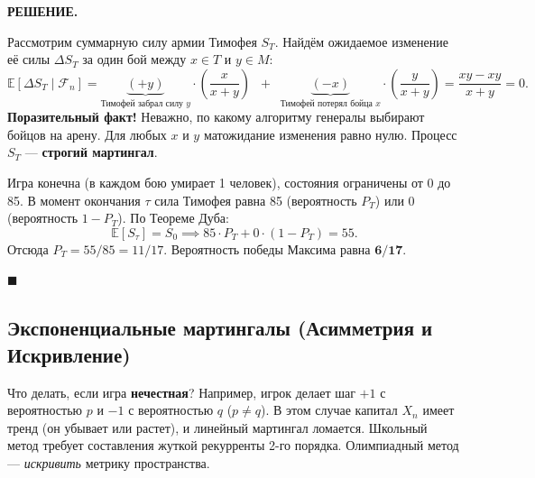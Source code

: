 \documentclass[12pt,a4paper]{article}
\newcommand{\nicefrac}[2]{#1/#2}
\newcommand{\E}{\mathbb{E}}
\newcommand{\F}{\mathcal{F}}
\newenvironment{solution}{
    \begin{tcolorbox}[
        enhanced, breakable, blanker,
        borderline west={2.5pt}{0pt}{solgray},
        left=12pt, top=5pt, bottom=5pt,
        before skip=10pt, after skip=15pt
    ]
    \textbf{\textsf{РЕШЕНИЕ.}}\;
}{
    \hfill $\blacksquare$
    \end{tcolorbox}
}
\begin{document}
\begin{solution}
Рассмотрим суммарную силу армии Тимофея $S_T$. Найдём ожидаемое изменение её силы $\Delta S_T$ за один бой между $x \in T$ и $y \in M$:
\[ \E[\Delta S_T \mid \F_n] = \underbrace{(+y)}_{\text{Тимофей забрал силу } y} \cdot \left(\frac{x}{x+y}\right) \;\; + \;\; \underbrace{(-x)}_{\text{Тимофей потерял бойца } x} \cdot \left(\frac{y}{x+y}\right) = \frac{xy - xy}{x+y} = 0. \]
\textbf{Поразительный факт!} Неважно, по какому алгоритму генералы выбирают бойцов на арену. Для любых $x$ и $y$ матожидание изменения равно нулю. Процесс $S_T$ --- \textbf{строгий мартингал}.

Игра конечна (в каждом бою умирает 1 человек), состояния ограничены от 0 до 85. В момент окончания $\tau$ сила Тимофея равна 85 (вероятность $P_T$) или 0 (вероятность $1-P_T$). По Теореме Дуба:
\[ \E[S_\tau] = S_0 \implies 85 \cdot P_T + 0 \cdot (1-P_T) = 55. \]
Отсюда $P_T = \nicefrac{55}{85} = \nicefrac{11}{17}$. Вероятность победы Максима равна $\mathbf{\nicefrac{6}{17}}$.
\end{solution}

\subsection{Экспоненциальные мартингалы (Асимметрия и Искривление)}

Что делать, если игра \textbf{нечестная}? Например, игрок делает шаг $+1$ с вероятностью $p$ и $-1$ с вероятностью $q$ ($p \neq q$). В этом случае капитал $X_n$ имеет тренд (он убывает или растет), и линейный мартингал ломается. Школьный метод требует составления жуткой рекурренты 2-го порядка. Олимпиадный метод — \textit{искривить} метрику пространства.

\begin{center}
\end{center}
\end{document}
